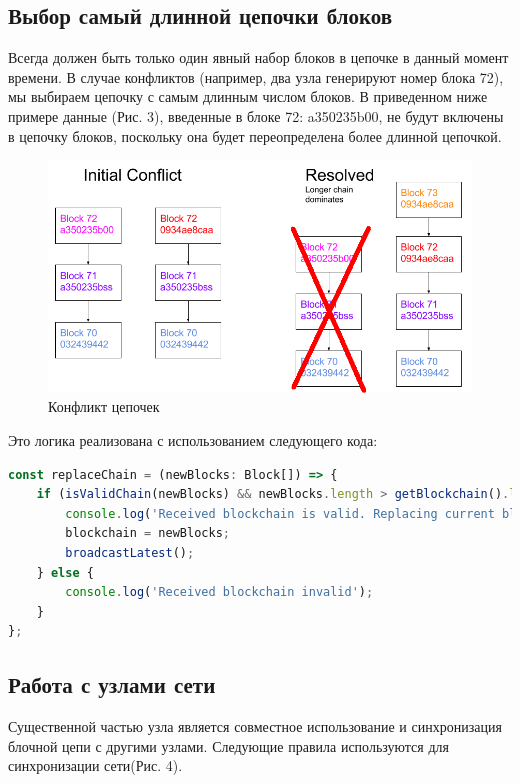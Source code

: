 \documentclass{article}
\begin{document}
\subsection{Выбор самый длинной цепочки блоков}

Всегда должен быть только один явный набор блоков в цепочке в данный момент времени. В случае конфликтов (например, два узла генерируют номер блока 72), мы выбираем цепочку с самым длинным числом блоков. В приведенном ниже примере данные (Рис. 3), введенные в блоке 72: a350235b00, не будут включены в цепочку блоков, поскольку она будет переопределена более длинной цепочкой.

\begin{figure}
	\centering
	\includegraphics[scale=0.35]{conflict_resolving}
	\caption{Конфликт цепочек}
	\label{fig:conflict_resolving}
\end{figure}

Это логика реализована с использованием следующего кода:


\begin{lstlisting}[language=JavaScript, caption={Выбор самой длинной цепочки блоков}]
const replaceChain = (newBlocks: Block[]) => {
	if (isValidChain(newBlocks) && newBlocks.length > getBlockchain().length) {
		console.log('Received blockchain is valid. Replacing current blockchain with received blockchain');
		blockchain = newBlocks;
		broadcastLatest();
	} else {
		console.log('Received blockchain invalid');
	}
};
\end{lstlisting}


\subsection{Работа с узлами сети}

Существенной частью узла является совместное использование и синхронизация блочной цепи с другими узлами. Следующие правила используются для синхронизации сети(Рис. 4).
\end{document}
